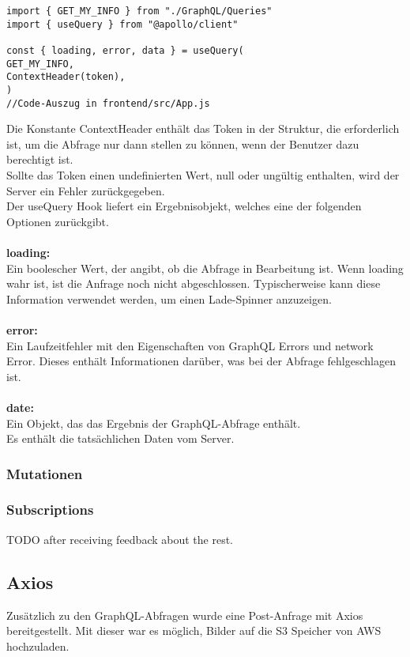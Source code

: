 \begin{lstlisting}
import { GET_MY_INFO } from "./GraphQL/Queries"
import { useQuery } from "@apollo/client"

const { loading, error, data } = useQuery(
GET_MY_INFO,
ContextHeader(token),
)
//Code-Auszug in frontend/src/App.js

\end{lstlisting}
Die Konstante ContextHeader enthält das Token in der Struktur, die erforderlich ist, um die Abfrage nur dann stellen zu können, wenn der Benutzer dazu berechtigt ist.
\\
Sollte das Token einen undefinierten Wert, null oder ungültig enthalten, wird der Server ein Fehler zurückgegeben.
\\
Der useQuery Hook liefert ein Ergebnisobjekt, welches eine der folgenden Optionen zurückgibt.
\\\\
\textbf{loading:}\\
Ein boolescher Wert, der angibt, ob die Abfrage in Bearbeitung ist.
Wenn loading wahr ist, ist die Anfrage noch nicht abgeschlossen. Typischerweise kann diese Information verwendet werden, um einen Lade-Spinner anzuzeigen.
\\\\
\textbf{error:}\\
Ein Laufzeitfehler mit den Eigenschaften von GraphQL Errors und network Error.
Dieses enthält Informationen darüber, was bei der Abfrage fehlgeschlagen  ist.
\\\\
\textbf{date:}\\
Ein Objekt, das das Ergebnis der GraphQL-Abfrage enthält.
\\Es enthält die tatsächlichen Daten vom Server.
\\
\newpage

\subsubsection{Mutationen}
\subsubsection{Subscriptions}

TODO after receiving feedback about the rest.

\newpage
\subsection{Axios}
Zusätzlich zu den GraphQL-Abfragen wurde eine Post-Anfrage mit Axios bereitgestellt.
Mit dieser war es möglich, Bilder auf die S3 Speicher von AWS hochzuladen.

